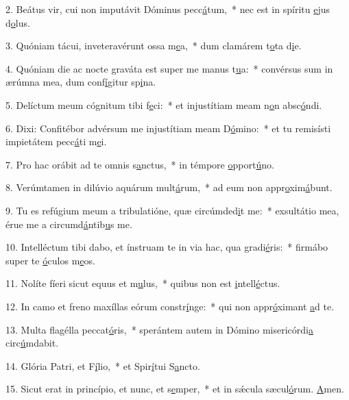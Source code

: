 2. Beátus vir, cui non imputávit Dóminus pecc\uline{á}tum,~* nec est in spíritu \uline{e}jus d\uline{o}lus.\par 
3. Quóniam tácui, inveteravérunt ossa m\uline{e}a,~* dum clamárem t\uline{o}ta d\uline{i}e.\par 
4. Quóniam die ac nocte graváta est super me manus t\uline{u}a:~* convérsus sum in ærúmna mea, dum conf\uline{í}gitur sp\uline{i}na.\par 
5. Delíctum meum cógnitum tibi f\uline{e}ci:~* et injustítiam meam n\uline{o}n absc\uline{ó}ndi.\par 
6. Dixi: Confitébor advérsum me injustítiam meam D\uline{ó}mino:~* et tu remisísti impietátem pecc\uline{á}ti m\uline{e}i.\par 
7. Pro hac orábit ad te omnis s\uline{a}nctus,~* in témpore \uline{o}pport\uline{ú}no.\par 
8. Verúmtamen in dilúvio aquárum mult\uline{á}rum,~* ad eum non appr\uline{o}xim\uline{á}bunt.\par 
9. Tu es refúgium meum a tribulatióne, quæ circúmded\uline{i}t me:~* exsultátio mea, érue me a circumd\uline{á}ntib\uline{u}s me.\par 
10. Intelléctum tibi dabo, et ínstruam te in via hac, qua gradi\uline{é}ris:~* firmábo super te \uline{ó}culos m\uline{e}os.\par 
11. Nolíte fíeri sicut equus et m\uline{u}lus,~* quibus non est \uline{i}ntell\uline{é}ctus.\par 
12. In camo et freno maxíllas eórum constr\uline{í}nge:~* qui non appr\uline{ó}ximant \uline{a}d te.\par 
13. Multa flagélla peccat\uline{ó}ris,~* sperántem autem in Dómino misericórdi\uline{a} circ\uline{ú}mdabit.\par 
14. Glória Patri, et F\uline{í}lio,~* et Spir\uline{í}tui S\uline{a}ncto.\par 
15. Sicut erat in princípio, et nunc, et s\uline{e}mper,~* et in sǽcula sæcul\uline{ó}rum. \uline{A}men.\par 
